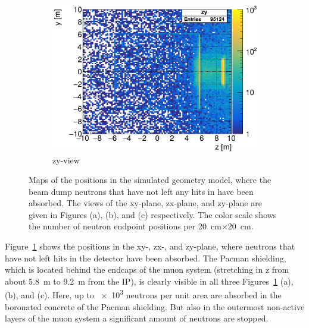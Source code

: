 \begin{figure}[!b]
\begin{subfigure}[b]{0.46\textwidth}
    \includegraphics[width=\textwidth]{Figures/BeamDump/neutrons_EndpointMap_zy.png}
   \caption{zy-view}
   \end{subfigure}
   \hfill
   \begin{minipage}{0.45\textwidth}
   \hfill
    \end{minipage}
   \caption[Beam dump neutrons absorbed without leaving hit in \sid]{Maps of the positions in the simulated geometry model, where the beam dump neutrons that have not left any hits in \sid have been absorbed.
   The views of the xy-plane, zx-plane, and zy-plane are given in Figures (a), (b), and (c) respectively.
   The color scale shows the number of neutron endpoint positions per \SI[detect-all]{20}{\centi\meter}$\times$\SI[detect-all]{20}{\centi\meter}.}
   \label{fig:BeamDumps:NeutronMissedMaps}
\end{figure} 
\FloatBarrier
Figure~\ref{fig:BeamDumps:NeutronMissedMaps} shows the positions in the xy-, zx-, and zy-plane, where neutrons that have not left hits in the \sid detector have been absorbed.
The Pacman shielding, which is located behind the endcaps of the \sid muon system (stretching in z from about \SI{5.8}{\meter} to \SI{9.2}{\meter} from the IP), is clearly visible in all three Figures~\ref{fig:BeamDumps:NeutronMissedMaps} (a), (b), and (c).
Here, up to \num{e3} neutrons per unit area are absorbed in the boronated concrete of the Pacman shielding.
But also in the outermost non-active layers of the \sid muon system a significant amount of neutrons are stopped.

